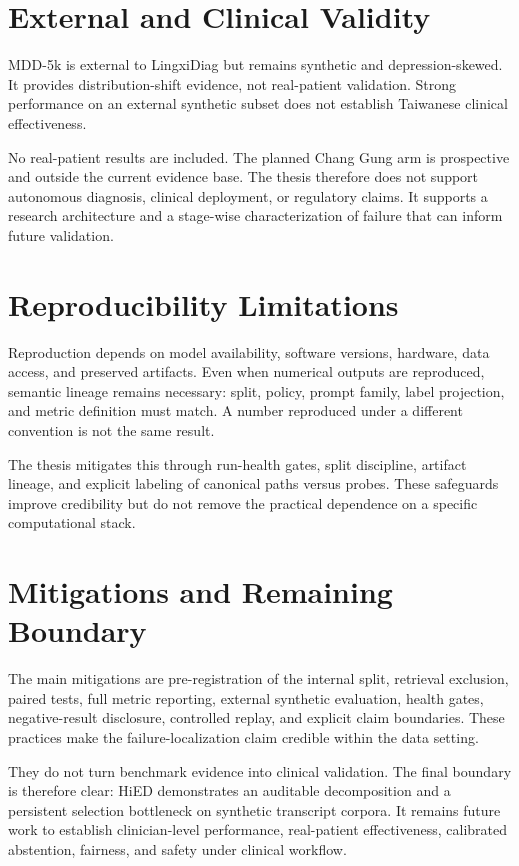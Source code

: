 \section{External and Clinical Validity}

MDD-5k is external to LingxiDiag but remains synthetic and depression-skewed. It provides distribution-shift evidence, not real-patient validation. Strong performance on an external synthetic subset does not establish Taiwanese clinical effectiveness.

No real-patient results are included. The planned Chang Gung arm is prospective and outside the current evidence base. The thesis therefore does not support autonomous diagnosis, clinical deployment, or regulatory claims. It supports a research architecture and a stage-wise characterization of failure that can inform future validation.

\section{Reproducibility Limitations}

Reproduction depends on model availability, software versions, hardware, data access, and preserved artifacts. Even when numerical outputs are reproduced, semantic lineage remains necessary: split, policy, prompt family, label projection, and metric definition must match. A number reproduced under a different convention is not the same result.

The thesis mitigates this through run-health gates, split discipline, artifact lineage, and explicit labeling of canonical paths versus probes. These safeguards improve credibility but do not remove the practical dependence on a specific computational stack.

\section{Mitigations and Remaining Boundary}

The main mitigations are pre-registration of the internal split, retrieval exclusion, paired tests, full metric reporting, external synthetic evaluation, health gates, negative-result disclosure, controlled replay, and explicit claim boundaries. These practices make the failure-localization claim credible within the data setting.

They do not turn benchmark evidence into clinical validation. The final boundary is therefore clear: HiED demonstrates an auditable decomposition and a persistent selection bottleneck on synthetic transcript corpora. It remains future work to establish clinician-level performance, real-patient effectiveness, calibrated abstention, fairness, and safety under clinical workflow.
